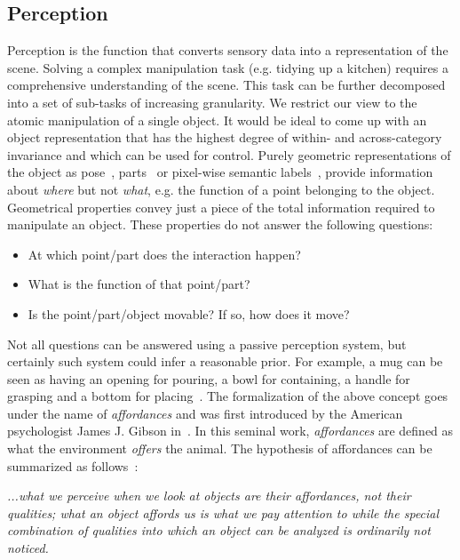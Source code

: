 \subsection{Perception}
Perception is the function that converts sensory data into a representation of the scene. Solving a complex manipulation task (e.g. tidying up a kitchen) requires a comprehensive understanding of the scene. This task can be further decomposed into a set of sub-tasks of increasing granularity. We restrict our view to the atomic manipulation of a single object. It would be ideal to come up with an object representation that has the highest degree of within- and across-category invariance and which can be used for control. Purely geometric representations of the object as pose~\cite{xiang2017posecnn}, parts~\cite{li2020category} or pixel-wise semantic labels~\cite{jang2017end}, provide information about \emph{where} but not \emph{what}, e.g. the function of a point belonging to the object. Geometrical properties convey just a piece of the total information required to manipulate an object. These properties do not answer the following questions:
\begin{itemize}
\item At which point/part does the interaction happen?
\item What is the function of that point/part?
\item Is the point/part/object movable? If so, how does it move?
\end{itemize}     
Not all questions can be answered using a passive perception system, but certainly such system could infer a reasonable prior. For example, a mug can be seen as having an opening for pouring, a bowl for containing, a handle for grasping and a bottom for placing~\cite{fagg1998modeling}. The formalization of the above concept goes under the name of \emph{affordances} and was first introduced by the American psychologist James J. Gibson in~\cite{gibson1977theory}. In this seminal work, \emph{affordances} are defined as what the environment \emph{offers} the animal. The hypothesis of affordances can be summarized as follows~\cite{gibson1977theory}:
\begin{displayquote}
\emph{...what we perceive when we look at objects are their affordances, not their qualities; what an object affords us is what we pay attention to while the special combination of qualities into which an object can be analyzed is ordinarily not noticed.} 
\end{displayquote}


